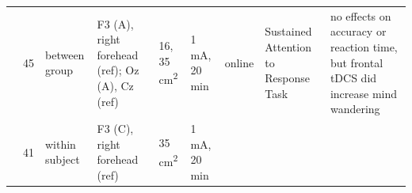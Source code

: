 \documentclass[11pt,english,]{memoir}
\begin{document}
\begin{longtable}[]{@{}lllllllll@{}}
\begin{minipage}[t]{0.08\columnwidth}
\textcite{Axelrod2015}\strut
\end{minipage} & \begin{minipage}[t]{0.02\columnwidth}\raggedright
45\strut
\end{minipage} & \begin{minipage}[t]{0.04\columnwidth}\raggedright
between
group\strut
\end{minipage} & \begin{minipage}[t]{0.13\columnwidth}\raggedright
F3 (A), right forehead (ref);
Oz (A), Cz (ref)\strut
\end{minipage} & \begin{minipage}[t]{0.03\columnwidth}\raggedright
16,
35
cm\textsuperscript{2}\strut
\end{minipage} & \begin{minipage}[t]{0.05\columnwidth}\raggedright
1 mA, 20
min\strut
\end{minipage} & \begin{minipage}[t]{0.06\columnwidth}\raggedright
online\strut
\end{minipage} & \begin{minipage}[t]{0.11\columnwidth}\raggedright
Sustained Attention to
Response Task\strut
\end{minipage} & \begin{minipage}[t]{0.24\columnwidth}\raggedright
no effects on accuracy or reaction time, but frontal
tDCS did increase mind wandering\strut
\end{minipage}\tabularnewline
\begin{minipage}[t]{0.08\columnwidth}\raggedright
\textcite{Nieratschker2015}\strut
\end{minipage} & \begin{minipage}[t]{0.02\columnwidth}\raggedright
41\strut
\end{minipage} & \begin{minipage}[t]{0.04\columnwidth}\raggedright
within
subject\strut
\end{minipage} & \begin{minipage}[t]{0.13\columnwidth}\raggedright
F3 (C), right forehead (ref)\strut
\end{minipage} & \begin{minipage}[t]{0.03\columnwidth}\raggedright
35
cm\textsuperscript{2}\strut
\end{minipage} & \begin{minipage}[t]{0.05\columnwidth}\raggedright
1 mA, 20
min\strut
\end{minipage} & \begin{minipage}[t]{0.06\columnwidth}\raggedright

\end{minipage}
\end{longtable}
\end{document}
